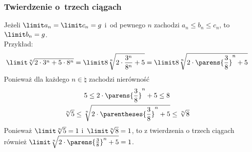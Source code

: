 \subsubsection*{Twierdzenie o~trzech ciągach}
Jeżeli \(\limit a_n = \limit c_n = g\) i~od pewnego \(n\) zachodzi \(a_n \leq b_n \leq c_n\), to \(\limit b_n = g\).\\
Przykład:
\begin{equation*}
    \limit \sqrt[n]{2\cdot3^n + 5\cdot8^n}
        = \limit 8\sqrt[n]{2\cdot\frac{3^n}{8^n} + 5}
        = \limit 8\sqrt[n]{2\cdot\parens{\frac{3}{8}}^n + 5}
\end{equation*}
Ponieważ dla każdego \(n \in \natural\) zachodzi nierówność
\begin{gather*}
    5 \leq 2\cdot\parens{\frac{3}{8}}^n + 5 \leq 8\\
    \sqrt[n]{5} \leq \sqrt[n]{2\cdot\parentheses{\frac{3}{8}}^n + 5} \leq \sqrt[n]{8}
\end{gather*}
Ponieważ \(\limit\sqrt[n]{5} = 1\) i~\(\limit\sqrt[n]{8} = 1\), to z twierdzenia o trzech ciągach również \(\limit\sqrt[n]{2\cdot\parens{\frac{3}{8}}^n + 5} = 1\).
